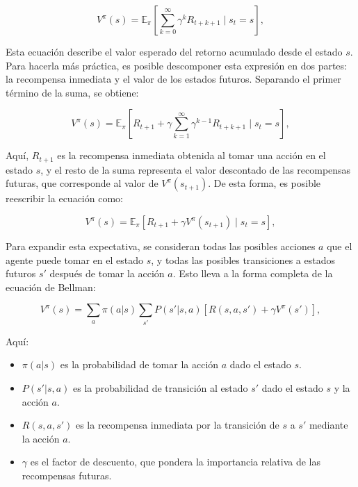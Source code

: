\documentclass[a4paper,12pt, twoside]{report}
\begin{document}
\begin{equation}
V^\pi(s) = \mathbb{E}_\pi \left[ \sum_{k=0}^{\infty} \gamma^k R_{t+k+1} \mid s_t = s \right],
\end{equation}

Esta ecuación describe el valor esperado del retorno acumulado desde el estado \(s\). 
Para hacerla más práctica, es posible descomponer esta expresión en dos partes: la 
recompensa inmediata y el valor de los estados futuros. Separando el primer término de 
la suma, se obtiene:

\begin{equation}
V^\pi(s) = \mathbb{E}_\pi \left[ R_{t+1} + \gamma \sum_{k=1}^{\infty} \gamma^{k-1} R_{t+k+1} \mid s_t = s \right],
\end{equation}

Aquí, \(R_{t+1}\) es la recompensa inmediata obtenida al tomar una acción en el estado \(s\), 
y el resto de la suma representa el valor descontado de las recompensas futuras, que 
corresponde al valor de \(V^\pi(s_{t+1})\). De esta forma, es posible reescribir la ecuación como:

\begin{equation}
V^\pi(s) = \mathbb{E}_\pi \left[ R_{t+1} + \gamma V^\pi(s_{t+1}) \mid s_t = s \right],
\end{equation}

Para expandir esta expectativa, se consideran todas las posibles acciones \(a\) que el agente 
puede tomar en el estado \(s\), y todas las posibles transiciones a estados futuros \(s'\) 
después de tomar la acción \(a\). Esto lleva a la forma completa de la ecuación de Bellman:

\begin{equation}
V^\pi(s) = \sum_{a} \pi(a|s) \sum_{s'} P(s'|s,a) \left[ R(s,a,s') + \gamma V^\pi(s') \right],
\end{equation}

Aquí:
\begin{itemize}
    \item \(\pi(a|s)\) es la probabilidad de tomar la acción \(a\) dado el estado \(s\).
    \item \(P(s'|s,a)\) es la probabilidad de transición al estado \(s'\) dado el estado \(s\) y la acción \(a\).
    \item \(R(s,a,s')\) es la recompensa inmediata por la transición de \(s\) a \(s'\) mediante la acción \(a\).
    \item \(\gamma\) es el factor de descuento, que pondera la importancia relativa de las recompensas futuras.
\end{itemize}
\end{document}
